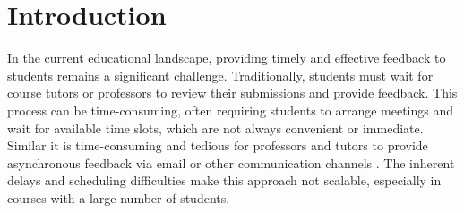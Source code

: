 \documentclass[manuscript,screen,review]{acmart}
\begin{document}



\maketitle

\section{Introduction} %


In the current educational landscape, providing timely and effective feedback to students remains a significant challenge.
Traditionally, students must wait for course tutors or professors to review their submissions and provide feedback.
This process can be time-consuming, often requiring students to arrange meetings and wait for available time slots, which are not always convenient or immediate.
Similar it is time-consuming and tedious for professors and tutors to provide asynchronous feedback via email or other communication channels \cite{henderson:2019:ChallengesFeedbackHigher}.
The inherent delays and scheduling difficulties make this approach not scalable, especially in courses with a large number of students.
\end{document}

